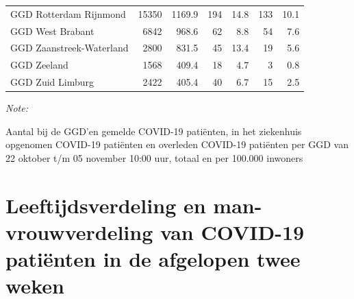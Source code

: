 \documentclass[
  english,
  man,floatsintext]{apa6}
\begin{document}
\begin{table}[H]
\begin{threeparttable}
\begin{tabular}{lrrrrrr}
GGD Rotterdam Rijnmond & 15350 & 1169.9 & 194 & 14.8 & 133 & 10.1\\
GGD West Brabant & 6842 & 968.6 & 62 & 8.8 & 54 & 7.6\\
GGD Zaanstreek-Waterland & 2800 & 831.5 & 45 & 13.4 & 19 & 5.6\\
GGD Zeeland & 1568 & 409.4 & 18 & 4.7 & 3 & 0.8\\
GGD Zuid Limburg & 2422 & 405.4 & 40 & 6.7 & 15 & 2.5\\
\bottomrule
\end{tabular}
\begin{tablenotes}
\item \textit{Note: } 
\item Aantal bij de GGD’en gemelde COVID-19 patiënten, in het ziekenhuis opgenomen COVID-19 patiënten en overleden COVID-19 patiënten per GGD van 22 oktober t/m 05 november 10:00 uur, totaal en per 100.000 inwoners
\end{tablenotes}
\end{threeparttable}
\endgroup{}
\end{table}

\newpage

\hypertarget{leeftijdsverdeling-en-man-vrouwverdeling-van-covid-19-patiuxebnten-in-de-afgelopen-twee-weken}{%
\section{Leeftijdsverdeling en man-vrouwverdeling van COVID-19 patiënten in de afgelopen twee weken}\label{leeftijdsverdeling-en-man-vrouwverdeling-van-covid-19-patiuxebnten-in-de-afgelopen-twee-weken}}
\end{document}
